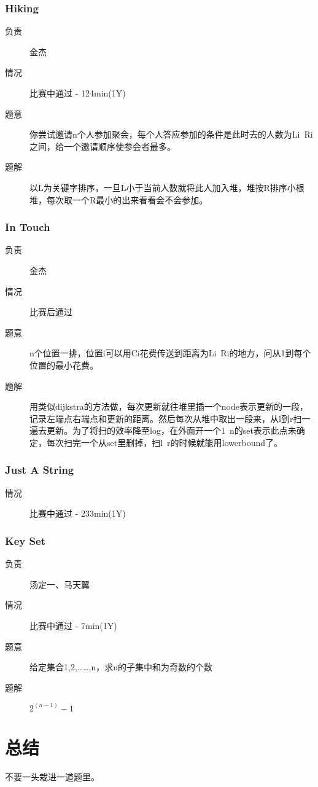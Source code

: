 \documentclass[a4paper, 11pt, nofonts, nocap, fancyhdr]{ctexart}
\newcommand{\problem}[1]{\subsubsection{#1}}
\begin{document}
\problem{Hiking}

\begin{description}
\item[负责] 金杰
\item[情况] 比赛中通过 - 124min(1Y)
\item[题意]
你尝试邀请n个人参加聚会，每个人答应参加的条件是此时去的人数为Li~Ri之间，给一个邀请顺序使参会者最多。
\item[题解]
以L为关键字排序，一旦L小于当前人数就将此人加入堆，堆按R排序小根堆，每次取一个R最小的出来看看会不会参加。
\end{description}

\problem{In Touch}

\begin{description}
\item[负责] 金杰
\item[情况] 比赛后通过
\item[题意]
n个位置一排，位置i可以用Ci花费传送到距离为Li~Ri的地方，问从1到每个位置的最小花费。
\item[题解]
用类似dijkstra的方法做，每次更新就往堆里插一个node表示更新的一段，记录左端点右端点和更新的距离。然后每次从堆中取出一段来，从l到r扫一遍去更新。为了将扫的效率降至log，在外面开一个1~n的set表示此点未确定，每次扫完一个从set里删掉，扫l~r的时候就能用lowerbound了。
\end{description}

\problem{Just A String}

\begin{description}
\item[情况] 比赛中通过 - 233min(1Y)
\end{description}

\problem{Key Set}

\begin{description}
\item[负责]汤定一、马天翼
\item[情况] 比赛中通过 - 7min(1Y)
\item[题意]
给定集合{1,2,……,n}，求n的子集中和为奇数的个数
\item[题解]
$2^(n-1)-1$
\end{description}

\section{总结}

不要一头栽进一道题里。
\end{document}

